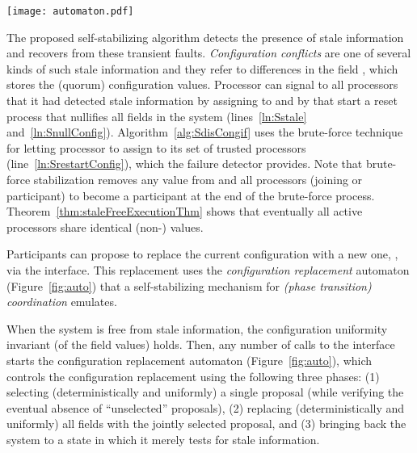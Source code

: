 \documentclass[11pt]{article}
\begin{document}
{\begin{figure*}[t!] 
\center
\texttt{[image: automaton.pdf]}
    \caption{The configuration replacement automaton}
    \label{fig:auto}
\end{figure*} 


The proposed self-stabilizing algorithm detects the presence of stale information and recovers from these transient faults. {\em Configuration conflicts} are one of several kinds of such stale information and they refer to differences in the field , which stores the (quorum) configuration values. Processor  can signal to all processors that it had detected stale information by assigning  to  and by that start a reset process that nullifies all  fields in the system (lines~\ref{ln:Sstale} and~\ref{ln:SnullConfig}). 
Algorithm~\ref{alg:SdisCongif} uses the brute-force technique for letting processor  to assign to  its set of trusted processors (line~\ref{ln:SrestartConfig}), which the failure detector  provides. Note that brute-force stabilization removes any  value from  and all processors (joining or participant) to become a participant at the end of the brute-force process. Theorem~\ref{thm:staleFreeExecutionThm} shows that eventually all active processors share identical (non-)  values.




Participants can propose to replace the current configuration with a new one, , via the  interface. This replacement uses the {\em configuration replacement} automaton (Figure~\ref{fig:auto}) that a self-stabilizing mechanism for {\em (phase transition) coordination} emulates.  


When the system is free from stale information, the configuration uniformity invariant (of the  field values) holds. Then, any number of calls to the  interface starts the configuration replacement automaton (Figure~\ref{fig:auto}), which controls the configuration replacement using the following three phases: (1) selecting (deterministically and uniformly) a single proposal (while verifying the eventual absence of ``unselected'' proposals), (2) replacing (deterministically and uniformly) all  fields with the jointly selected proposal, and (3) bringing back the system to a state in which it merely tests for stale information. 

}
\end{document}

